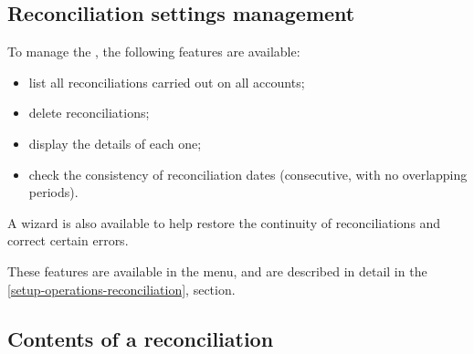 \subsection{Reconciliation settings management\label{reconciliation-manage-parameters}}

To manage the , the following features are available:
\begin{itemize}
	\item list all reconciliations carried out on all accounts;
	\item delete reconciliations;
	\item display the details of each one;
	\item check the consistency of reconciliation dates (consecutive, with no overlapping periods).
\end{itemize}

A wizard is also available to help restore the continuity of reconciliations and correct certain errors.

These features are available in the  menu, and are described in detail in the \vref{setup-operations-reconciliation},  section.


\subsection{Contents of a reconciliation\label{reconciliation-manage-content}}

